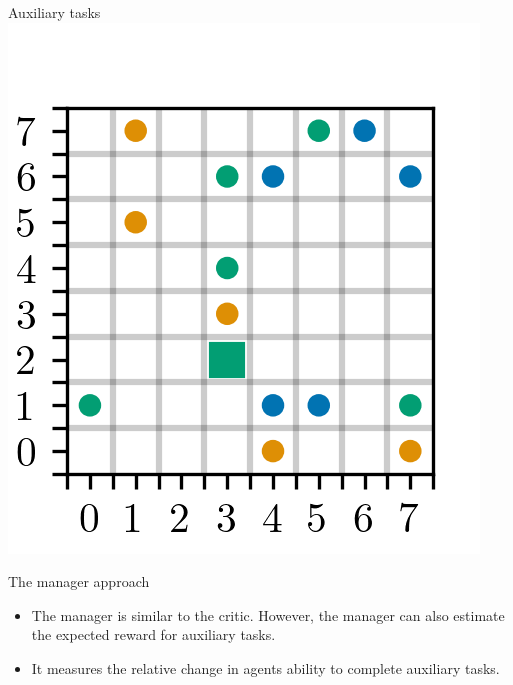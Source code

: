 \documentclass[10pt]{beamer}
\begin{document}
\begin{frame}{Auxiliary tasks}
  \includegraphics[scale=0.8]{"./figures/aux_2.png"}
\end{frame}

\begin{frame}{The manager approach}
\begin{itemize}[<+- | alert@+>]
    \item The manager is similar to the critic. However, the manager can also estimate the expected reward for auxiliary tasks.
    \item It measures the relative change in agents ability to complete auxiliary tasks.
\end{itemize}
\end{frame}
\end{document}
